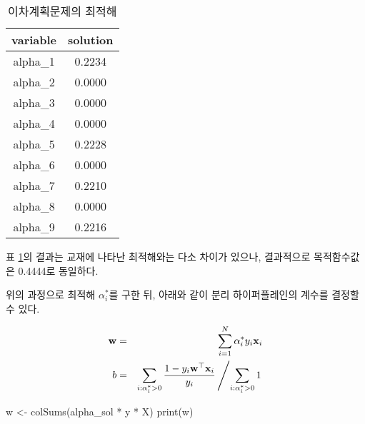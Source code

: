 \documentclass[
]{book}
\newenvironment{Shaded}{\begin{snugshade}}{\end{snugshade}}
\newcommand{\FunctionTok}[1]{\textcolor[rgb]{0.00,0.00,0.00}{#1}}
\newcommand{\NormalTok}[1]{#1}
\newcommand{\OtherTok}[1]{\textcolor[rgb]{0.56,0.35,0.01}{#1}}
\newcommand{\SpecialCharTok}[1]{\textcolor[rgb]{0.00,0.00,0.00}{#1}}
\begin{document}
\begin{Shaded}
\end{Shaded}

\begin{table}

\caption{\label{tab:svm-separable-alpha}이차계획문제의 최적해}
\centering
\begin{tabular}[t]{cc}
\toprule
variable & solution\\
\midrule
alpha\_1 & 0.2234\\
alpha\_2 & 0.0000\\
alpha\_3 & 0.0000\\
alpha\_4 & 0.0000\\
alpha\_5 & 0.2228\\
\addlinespace
alpha\_6 & 0.0000\\
alpha\_7 & 0.2210\\
alpha\_8 & 0.0000\\
alpha\_9 & 0.2216\\
\bottomrule
\end{tabular}
\end{table}

표 \ref{tab:svm-separable-alpha}의 결과는 교재\citep{jun2012datamining}에 나타난 최적해와는 다소 차이가 있으나, 결과적으로 목적함수값은 0.4444로 동일하다.

위의 과정으로 최적해 \(\alpha_{i}^{*}\)를 구한 뒤, 아래와 같이 분리 하이퍼플레인의 계수를 결정할 수 있다.

\begin{eqnarray*}
\mathbf{w} &=& \sum_{i = 1}^{N} \alpha_{i}^{*} y_{i} \mathbf{x}_{i}\\
b &=& \sum_{i: \alpha_{i}^{*} > 0} \frac{1 - y_{i} \mathbf{w}^{\top} \mathbf{x}_{i}}{y_{i}} \left/ \sum_{i: \alpha_{i}^{*} > 0} 1 \right. 
\end{eqnarray*}

\begin{Shaded}
\begin{Highlighting}[]
\NormalTok{w }\OtherTok{\textless{}{-}} \FunctionTok{colSums}\NormalTok{(alpha\_sol }\SpecialCharTok{*}\NormalTok{ y }\SpecialCharTok{*}\NormalTok{ X)}
\FunctionTok{print}\NormalTok{(w)}
\end{Highlighting}
\end{Shaded}
\end{document}

